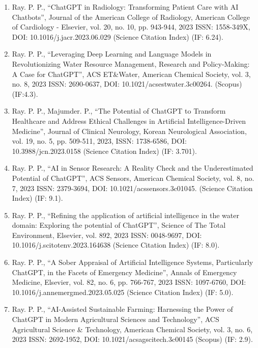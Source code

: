 \documentclass[11pt,a4paper]{moderncv}
\begin{document}
\begin{adjustwidth}{6em}{0pt}
\begin{enumerate}
		\item Ray. P. P., “ChatGPT in Radiology: Transforming Patient Care with AI Chatbots”, Journal of the American College of Radiology, American College of Cardiology - Elsevier, vol. 20, no. 10, pp. 943-944, 2023 ISSN: 1558-349X, DOI: 10.1016/j.jacr.2023.06.029 (Science Citation Index) (IF: 6.24). 
		
		\item Ray. P. P., “Leveraging Deep Learning and Language Models in Revolutionizing Water Resource Management, Research and Policy-Making: A Case for ChatGPT”, ACS ET\&Water, American Chemical Society, vol. 3, no. 8, 2023 ISSN: 2690-0637, DOI: 10.1021/acsestwater.3c00264. (Scopus) (IF:4.3). 
		
		\item Ray. P. P., Majumder. P., “The Potential of ChatGPT to Transform Healthcare and Address Ethical Challenges in Artificial Intelligence-Driven Medicine”, Journal of Clinical Neurology, Korean Neurological Association, vol. 19, no. 5, pp. 509-511, 2023, ISSN: 1738-6586, DOI: 10.3988/jcn.2023.0158 (Science Citation Index) (IF: 3.701). 
		
		\item Ray. P. P., “AI in Sensor Research: A Reality Check and the Underestimated Potential of ChatGPT”, ACS Sensors, American Chemical Society, vol. 8, no. 7, 2023 ISSN: 2379-3694, DOI: 10.1021/acssensors.3c01045. (Science Citation Index) (IF: 9.1). 
		
		\item Ray. P. P., “Refining the application of artificial intelligence in the water domain: Exploring the potential of ChatGPT”, Science of The Total Environment, Elsevier, vol. 892, 2023 ISSN: 0048-9697, DOI: 10.1016/j.scitotenv.2023.164638 (Science Citation Index) (IF: 8.0). 
		
		\item Ray. P. P., “A Sober Appraisal of Artificial Intelligence Systems, Particularly ChatGPT, in the Facets of Emergency Medicine”, Annals of Emergency Medicine, Elsevier, vol. 82, no. 6, pp. 766-767, 2023 ISSN: 1097-6760, DOI: 10.1016/j.annemergmed.2023.05.025 (Science Citation Index) (IF: 5.0). 
		
		\item Ray. P. P., “AI-Assisted Sustainable Farming: Harnessing the Power of ChatGPT in Modern Agricultural Sciences and Technology”, ACS Agricultural Science \& Technology, American Chemical Society, vol. 3, no. 6, 2023 ISSN: 2692-1952, DOI: 10.1021/acsagscitech.3c00145 (Scopus) (IF: 2.9). 
		

\end{enumerate}
\end{adjustwidth}
\end{document}
